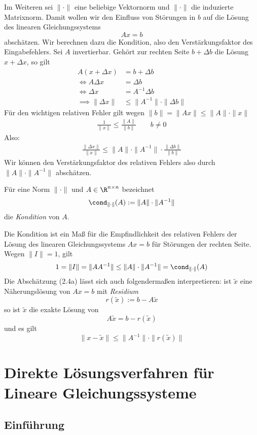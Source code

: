 \documentclass{mycourse}
\begin{document}
Im Weiteren sei $\|\cdot\|$ eine beliebige Vektornorm und $\|\cdot\|$ die induzierte Matrixnorm.
Damit wollen wir den Einfluss von Störungen in $b$ auf die Lösung des linearen Gleichungssystems
\[
Ax=b
\]
abschätzen.
Wir berechnen dazu die Kondition, also den Verstärkungsfaktor des Eingabefehlers.
Sei $A$ invertierbar.
Gehört zur rechten Seite $b+\Delta b$ die Lösung $x+\Delta x$, so gilt
\begin{align*}
A(x+\Delta x)&=b+\Delta b\\
\iff A\Delta x &= \Delta b\\
\iff \Delta x &= A^{-1}\Delta b\\
\implies \|\Delta x\|&\le \|A^{-1}\|\cdot \|\Delta b\| \tag{2.4a}
\end{align*}
Für den wichtigen relativen Fehler gilt wegen $\|b\| = \|Ax\| \le\|A\|\cdot\|x\|$
\begin{align*}
\frac 1{\|x\|}\le \frac {\|A\|}{\|b\|} \qquad b\neq 0
\end{align*}
Also:
\begin{align*}
\frac{\|\Delta x\|}{\|x\|} \le \|A\|\cdot \|A^{-1}\|\cdot \frac{\|\Delta b\|}{\|b\|} \tag{2.4b}
\end{align*}
Wir können den Verstärkungsfaktor des relativen Fehlers also durch $\|A\|\cdot\|A^{-1}\|$ abschätzen.

\begin{df}
\label{df:2.14}
Für eine Norm $\|\cdot\|$ und $A\in \R^{n\times n}$ bezeichnet
\[
\cond_{\|\cdot\|}(A) := \|A\|\cdot\|A^{-1}\|
\]
die \emph{Kondition} von $A$.

Die Kondition ist ein Maß für die Empfindlichkeit des relativen Fehlers der Lösung des linearen Gleichungssystems $Ax=b$ für Störungen der rechten Seite.
Wegen $\|I\|=1$, gilt
\[
1=\|I\|=\|AA^{-1}\|\le \|A\|\cdot\|A^{-1}\|=\cond_{\|\cdot\|}(A)
\]
Die Abschätzung (2.4a) lässt sich auch folgendermaßen interpretieren:
ist $\tilde x$ eine Näherungslösung von $Ax=b$ mit \emph{Residium}
\[
r(\tilde x) := b -A\tilde x
\]
so ist $\tilde x$ die exakte Lösung von
\[
A\tilde x = b -r(\tilde x)
\]
und es gilt
\[
\|x-\tilde x\| \le \|A^{-1}\| \cdot \|r(\tilde x)\|
\]

\end{df}

\chapter{Direkte Lösungsverfahren für Lineare Gleichungssysteme}
\section{Einführung}
\end{document}

